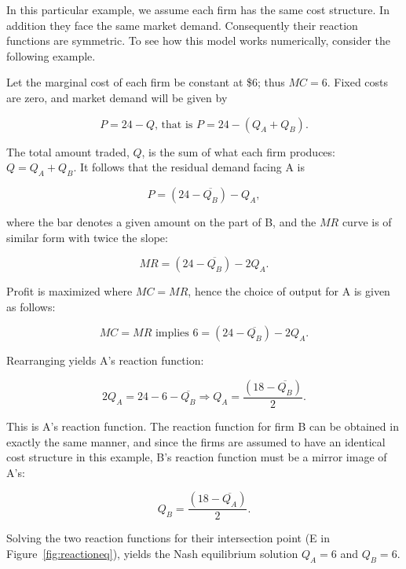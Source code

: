 In this particular example, we assume each firm has the same cost structure. In addition they face the same market demand. Consequently their reaction functions are symmetric. To see how this model works numerically, consider the following example.

Let the marginal cost of each firm be constant at \$6; thus $MC=6$. Fixed costs are zero, and market demand will be given by

\begin{equation*}
P=24-Q\text{, that is }P=24-(Q_A+Q_B).
\end{equation*}

The total amount traded, $Q$, is the sum of what each firm produces: $Q=Q_A+Q_B$. It follows that the residual demand facing A is

\begin{equation*}
P=(24-\overline{Q_B})-Q_A,
\end{equation*}

where the bar denotes a given amount on the part of B, and the $MR$ curve is of similar form with twice the slope:

\begin{equation*}
MR=(24-\overline{Q_B})-2Q_A.
\end{equation*}

Profit is maximized where $MC=MR$, hence the choice of output for A is given as follows:

\begin{equation*}
MC=MR\text{ implies }6=(24-\overline{Q_B})-2Q_A.
\end{equation*}

Rearranging yields A's reaction function:

\begin{equation*}
2Q_A=24-6-\overline{Q_B}\Rightarrow Q_A=\frac{(18-\overline{Q_B})}{2}.
\end{equation*}

This is A's reaction function. The reaction function for firm B can be obtained in exactly the same manner, and since the firms are assumed to have an identical cost structure in this example, B's reaction function must be a mirror image of A's:

\begin{equation*}
Q_B=\frac{(18-\overline{Q_A})}{2}.
\end{equation*}

Solving the two reaction functions for their intersection point (E in Figure~\ref{fig:reactioneq}), yields the Nash equilibrium solution $Q_A=6$ and $Q_B=6$.

